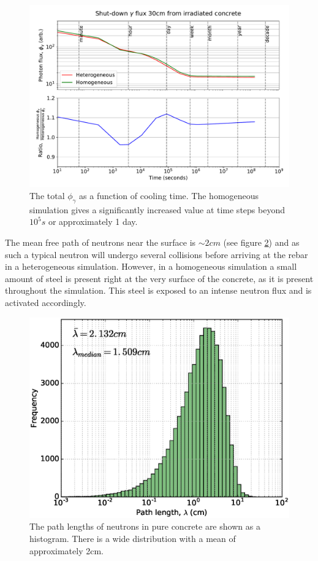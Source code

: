 \begin{figure}[H]
	\includegraphics[width=\textwidth]{sddr}
	\caption{The total $\phi_{\gamma}$ as a function of cooling time. The homogeneous simulation gives a significantly increased value at time steps beyond $10^{5}s$ or approximately 1 day.}
	\label{fig:sddr}
\end{figure}

The mean free path of neutrons near the surface is $\sim2cm$ (see figure \ref{fig:mfp}) and as such a typical neutron will undergo several collisions before arriving at the rebar in a heterogeneous simulation. However, in a homogeneous simulation a small amount of steel is present right at the very surface of the concrete, as it is present throughout the simulation. This steel is exposed to an intense neutron flux and is activated accordingly.

\begin{figure}[H]
	\includegraphics[width=\textwidth]{mfp}
	\caption{The path lengths of neutrons in pure concrete are shown as a histogram. There is a wide distribution with a mean of approximately 2cm.}
	\label{fig:mfp}
\end{figure}

